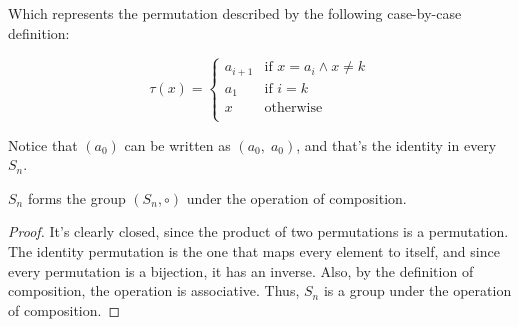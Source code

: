 Which represents the permutation described by the following case-by-case definition:

$$ \tau(x) = \begin{cases}
        a_{i+1} & \text{if } x = a_i \land x \neq k \\
        a_1 & \text{if } i = k \\
        x & \text{otherwise } \\
    \end{cases} 
$$ \vspace{0.2em}

\newpage

Notice that $(a_0)$ can be written as $(a_0,\; a_0)$, and that's the identity in every $S_n$. \\

\begin{lemma} 
    $S_n$ forms the group $(S_n, \circ)$ under the operation of composition.
\end{lemma} 
\begin{proof}
    It's clearly closed, since the product of two permutations is a
    permutation. The identity permutation is the one that maps every element to itself,
    and since every permutation is a bijection, it has an inverse. Also, by the definition of
    composition, the operation is associative. Thus, $S_n$ is a group under the operation of
    composition.
\end{proof} \vspace{0.2em}

